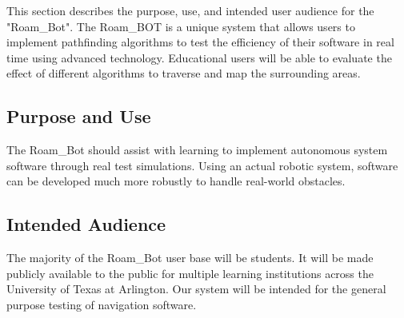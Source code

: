 This section describes the purpose, use, and intended user audience for the "Roam\_Bot". The Roam\_BOT is a unique system that allows users to implement pathfinding algorithms to test the efficiency of their software in real time using advanced technology. Educational users will be able to evaluate the effect of different algorithms to traverse and map the surrounding areas.


\subsection{Purpose and Use}
The Roam\_Bot should assist with learning to implement autonomous system software through real test simulations. Using an actual robotic system, software can be developed much more robustly to handle real-world obstacles. 


\subsection{Intended Audience}
The majority of the Roam\_Bot user base will be students. It will be made publicly available to the public for multiple learning institutions across the University of Texas at Arlington. Our system will be intended for the general purpose testing of navigation software.


